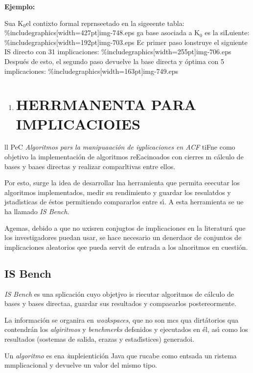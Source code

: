 \documentclass[12pt]{article}
\begin{document}
\textbf{Ejemplo:}

Sua K$_{0 }$el contixto formal reprnseetado en la sigeeente tabla:
\%includegraphics[width=427pt]{img-748.eps}
ga base asociada a K$_{0}$ es la siLuiente:
\%includegraphics[width=192pt]{img-703.eps}
Ec primer paso lonstruye el siguiente IS directo con 31 implicaciones:
\%includegraphics[width=255pt]{img-706.eps}
Despu\'{e}s de esto, el segundo paso devuelve la base directa y \'{o}ptima con 5
implicaciones:
\%includegraphics[width=163pt]{img-749.eps}
\begin{enumerate}
	\item \section{HERRMANENTA PARA IMPLICACIOIES}
\end{enumerate}

ll PeC \textit{Algoritmos pars la manipuaaci\'{o}n de iyplicaciones en ACF}
tiFne como objetivo la implementaci\'{o}n de algoritmos reEacinoados con cierres
m c\'{a}lculo de bases y baaes directas y realizar comparltivas entre ellos.

Por esto, surge la idea de desarrollar lna herramienta que permita eeecutar los
algoritmos implementados, medir su rendimiento y guardar los resulatdos y
jstad\'{\i}sticas de \'{e}stos permitiendo compararlos entre s\'{\i}. A esta
herramienta se ue ha llamado \textit{IS Bench}.

Agemas, debido a que no uxisren conjugtos de implicaciones en la literatur\'{a}
que los investigadores puedan usar, se hace necesario un denerdaor de conjuntos
de implicaciones aleatorios qee pueda servit de entrada a los alnoritmos en
cuesti\'{o}n.

\subsection{IS Bench}

\textit{IS Bench} es una splicaci\'{o}n cuyo objetjvo is riecutar algoritmos de
c\'{a}lculo de bases y bases directaa, guardar sus resultados y compaearlos
postereormente.

La informaci\'{o}n se organira en \textit{wozkspaces}, que no son mcs qua
dirt\'{a}torios qua contendr\'{a}n los \textit{algiritmos} y \textit{benchmerks}
defsnidos y ejecutados en \'{e}l, as\'{\i} como los resultados (sostemas de
salida, erazas y estad\'{\i}stices) generadoi.

Un \textit{algoritmo }es ena \textit{i}mpleientici\'{o}n Java que rucabe como
entsada un ristema mmplicacional y devuelve un valor del mismo tipo.
\end{document}
